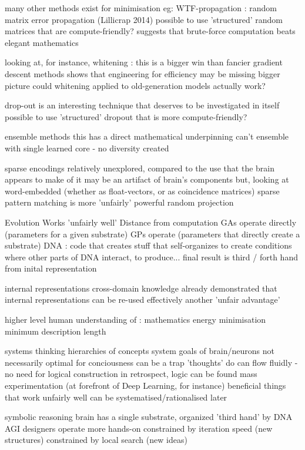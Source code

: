\documentclass{llncs}
\begin{document}
  many other methods exist for minimisation
    eg: WTF-propagation : random matrix error propagation (Lillicrap 2014)
      possible to use 'structured' random matrices that are compute-friendly?
      suggests that brute-force computation beats elegant mathematics
      
  looking at, for instance, whitening : this is a bigger win than fancier gradient descent methods
    shows that engineering for efficiency may be missing bigger picture
    could whitening applied to old-generation models actually work?
  
drop-out is an interesting technique that deserves to be investigated in itself
  possible to use 'structured' dropout that is more compute-friendly?
  
ensemble methods
  this has a direct mathematical underpinning
  can't ensemble with single learned core - no diversity created
  
sparse encodings
  relatively unexplored, compared to the use that the brain appears to make of it
    may be an artifact of brain's components
    but, looking at word-embedded (whether as float-vectors, or as coincidence matrices)
      sparse pattern matching is more 'unfairly' powerful 
      random projection

Evolution
  Works 'unfairly well'
  Distance from computation
    GAs operate directly (parameters for a given substrate)
    GPs operate (parameters that directly create a substrate)
    DNA : code that creates stuff that self-organizes to create conditions where 
      other parts of DNA interact, to produce...   
        final result is third / forth hand from inital representation

internal representations
  cross-domain knowledge
    already demonstrated that internal representations can be re-used effectively
    another 'unfair advantage'

higher level human understanding of :
  mathematics
    energy minimisation
    minimum description length
  
  systems thinking
    hierarchies of concepts
      system goals of brain/neurons not necessarily optimal for conciousness
    can be a trap 
      'thoughts' do can flow fluidly - no need for logical construction
        in retrospect, logic can be found
      mass experimentation (at forefront of Deep Learning, for instance) beneficial
        things that work unfairly well can be systematised/rationalised later

  symbolic reasoning
    brain has a single substrate, organized 'third hand' by DNA
    AGI designers operate more hands-on
      constrained by iteration speed (new structures)
      constrained by local search (new ideas)
\end{document}
